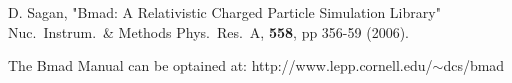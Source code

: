 \begin{thebibliography}{99}

D. Sagan,
"Bmad: A Relativistic Charged Particle Simulation Library"
Nuc.\ Instrum.\ \& Methods Phys.\ Res.\ A, {\bf 558}, pp 356-59 (2006).

The Bmad Manual can be optained at:\hfill\break
\hspace*{20pt} http://www.lepp.cornell.edu/$\scriptstyle\sim$dcs/bmad

\end{thebibliography}

